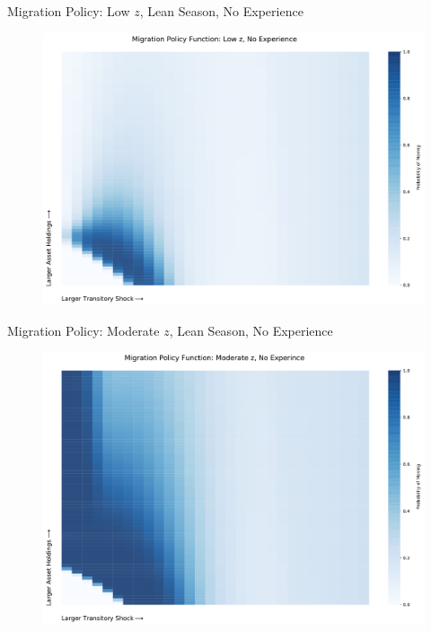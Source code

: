 \documentclass[9pt,pdftex,aspectratio=1610]{beamer}
\theoremstyle{definition}
\begin{document}
%
\begin{frame}[t]{Migration Policy: Low $z$, Lean Season, No Experience}
\begin{figure}[t]
\centerline{\includegraphics[scale = 0.37]{../figures/migration_policy_low_z.pdf}}
\end{figure}
\end{frame}
%
\begin{frame}[t]{Migration Policy: Moderate $z$, Lean Season, No Experience}
\begin{figure}[t]
\centerline{\includegraphics[scale = 0.37]{../figures/migration_policy_mod_z.pdf}}
\end{figure}
\end{frame}
\end{document}
